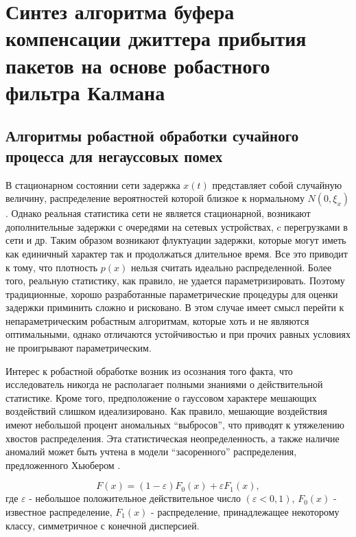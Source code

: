 \chapter{Синтез алгоритма буфера компенсации джиттера прибытия пакетов на основе робастного фильтра Калмана} \label{chapt3}

\section{Алгоритмы робастной обработки сучайного процесса для негауссовых помех} \label{sect3_0}

В стационарном состоянии сети задержка $x(t)$ представляет собой случайную величину, распределение вероятностей которой близкое к нормальному $N(0,\xi_x)$. 
Однако реальная статистика сети не является стационарной, возникают дополнительные задержки с очередями на сетевых устройствах, c перегрузками в сети и др. Таким образом возникают флуктуации задержки, которые могут иметь как единичный характер так и продолжаться длительное время.
Все это приводит к тому, что плотность $p(x)$ нельзя считать идеально распределенной. 
Более того, реальную статистику, как правило, не удается параметризировать. Поэтому традиционные, хорошо разработанные параметрические процедуры для оценки задержки приминить сложно и рисковано. 
В этом случае имеет смысл перейти к непараметрическим робастным алгоритмам, которые хоть и не являются оптимальными, однако отличаются устойчивостью и при прочих равных условиях не проигрывают параметрическим.

Интерес к робастной обработке возник из осознания того факта, что исследователь никогда не располагает полными знаниями о действительной статистике.
Кроме того, предположение о гауссовом характере мешающих воздействий слишком идеализировано.
Как правило, мешающие воздействия имеют небольшой процент аномальных ``выбросов'', что приводят к утяжелению хвостов распределения. 
Эта статистическая неопределенность, а также наличие аномалий может быть учтена в модели ``засоренного'' распределения, предложенного Хьюбером \cite{huber}.

\begin{equation}\label{eq3:huber}
F(x)=(1-\varepsilon)F_0(x)+\varepsilon F_1(x),
\end{equation}
\noindent где $\varepsilon$ - небольшое положительное действительное число $(\varepsilon<0,1)$, $F_0(x)$ - известное распределение, $F_1(x)$ - распределение, принадлежащее некоторому классу, симметричное с конечной дисперсией.

